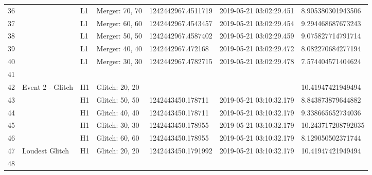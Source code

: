 \begin{longtable}{lllllll}
36   &                                                    &       L1 &    Merger: 70, 70 &  1242442967.4511719 &  2019-05-21 03:02:29.451 &   8.905380301943506 \\
37   &                                                    &       L1 &    Merger: 60, 60 &  1242442967.4543457 &  2019-05-21 03:02:29.454 &   9.294468687673243 \\
38   &                                                    &       L1 &    Merger: 50, 50 &  1242442967.4587402 &  2019-05-21 03:02:29.459 &   9.075827714791714 \\
39   &                                                    &       L1 &    Merger: 40, 40 &   1242442967.472168 &  2019-05-21 03:02:29.472 &   8.082270684277194 \\
40   &                                                    &       L1 &    Merger: 30, 30 &  1242442967.4782715 &  2019-05-21 03:02:29.478 &   7.574404571404624 \\
41   &                                                    &          &                   &                     &                          &                     \\
42   &                                   Event 2 - Glitch &       H1 &    Glitch: 20, 20 &                     &                          &   10.41947421949494 \\
43   &                                                    &       H1 &    Glitch: 50, 50 &   1242443450.178711 &  2019-05-21 03:10:32.179 &   8.843873879644882 \\
44   &                                                    &       H1 &    Glitch: 40, 40 &   1242443450.178711 &  2019-05-21 03:10:32.179 &   9.338665652734036 \\
45   &                                                    &       H1 &    Glitch: 30, 30 &   1242443450.178955 &  2019-05-21 03:10:32.179 &  10.243717208792035 \\
46   &                                                    &       H1 &    Glitch: 60, 60 &   1242443450.178955 &  2019-05-21 03:10:32.179 &   8.129050502371744 \\
47   &                                     Loudest Glitch &       H1 &    Glitch: 20, 20 &  1242443450.1791992 &  2019-05-21 03:10:32.179 &   10.41947421949494 \\
48   &                                                    &          &                   &                     &                          &                     \\

\end{longtable}
